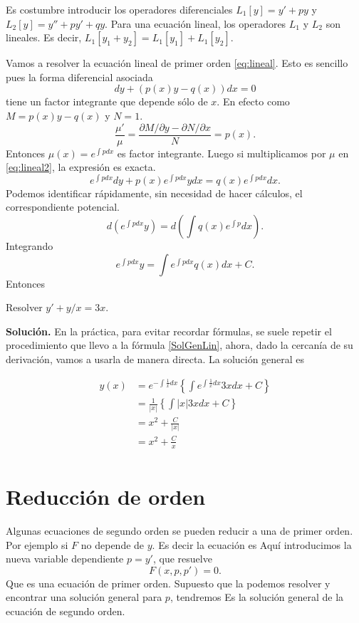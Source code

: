 Es costumbre introducir los operadores  diferenciales $L_1[y]=y'+py$  y $ L_2[y]=y''+py'+qy$.
Para una ecuación lineal, los operadores $L_1$ y $L_2$ son lineales. Es decir, $L_1[y_1+y_2]=L_1[y_1]+L_1[y_2]$.


 Vamos a resolver la ecuación lineal de primer orden \eqref{eq:lineal}. Esto es sencillo pues la forma diferencial asociada
 \begin{equation}\label{eq:lineal2}dy+(p(x)y-q(x))dx=0
  \end{equation}
tiene un factor integrante que depende sólo de $x$. En efecto como $M=p(x)y-q(x)$ y $N=1$.
 \[\frac{\mu'}{\mu}=\frac{\partial M/\partial y-\partial N/\partial x}{N}=p(x).\]
 Entonces $\mu(x)=e^{\int pdx}$ es factor integrante. Luego si multiplicamos por $\mu$ en \eqref{eq:lineal2},  la expresión  es exacta.
 \[e^{\int pdx}dy+p(x)e^{\int pdx}ydx=q(x)e^{\int pdx}dx.\]
Podemos identificar rápidamente, sin necesidad de hacer cálculos, el correspondiente potencial.
 \[d\left(e^{\int pdx}y\right)=d\left(\int q(x)e^{\int p} dx \right).\]
Integrando
\[e^{\int pdx}y=\int e^{\int pdx}q(x)dx+C.
 \]
Entonces


\begin{ejemplo} Resolver $y'+y/x=3x$.
 \end{ejemplo}


\noindent\textbf{Solución.} En la práctica, para evitar recordar fórmulas, se suele repetir el procedimiento que llevo a la fórmula \eqref{SolGenLin}, ahora, dado la cercanía
de su derivación, vamos a usarla  de manera directa. La solución general es

\[\begin{split} y(x)&=e^{-\int\frac{1}{x}dx}\left\{\int e^{\int\frac{1}{x}dx}3xdx+C\right\}\\
   &=\frac{1}{|x|}\left\{\int |x| 3xdx+C\right\}\\
   &=x^2+\frac{C}{|x|}\\
   &=x^2+\frac{C}{x}\\
  \end{split}
\]




\section{Reducción de orden}

Algunas ecuaciones de segundo orden
se pueden reducir a una de primer orden. Por ejemplo si $F$ no depende de $y$. Es decir la ecuación es
Aquí introducimos la nueva variable dependiente $\boxed{p=y'}$, que resuelve
\[F(x,p,p')=0.\]
Que es una ecuación de primer orden. Supuesto que la podemos resolver y encontrar una solución general para  $p$, tendremos
Es la solución general de la ecuación de segundo orden.


